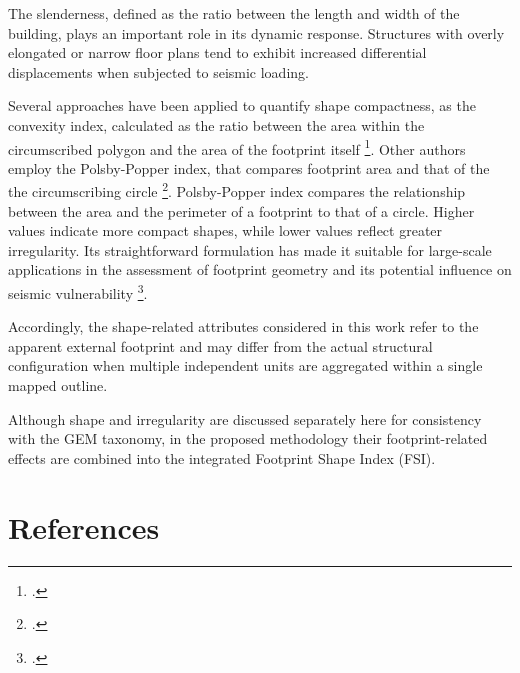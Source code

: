 \begin{refsection}
The slenderness, defined as the ratio between the length and width of the building, plays an important role in its dynamic response. Structures with overly elongated or narrow floor plans tend to exhibit increased differential displacements when subjected to seismic loading.

Several approaches have been applied to quantify shape compactness, as  the convexity index, calculated as the ratio between the area within the circumscribed polygon and the area of the footprint itself \footcite{sarabandi_building_2008, ji_fully_2019}. Other authors employ the Polsby-Popper index, that compares footprint area and that of the the circumscribing circle \footcite{polsby_third_1991}. Polsby-Popper index compares the relationship between the area and the perimeter of a footprint to that of a circle. Higher values indicate more compact shapes, while lower values reflect greater irregularity. Its straightforward formulation has made it suitable for large-scale applications in the assessment of footprint geometry and its potential influence on seismic vulnerability \footcite{torres_using_2023}.

Accordingly, the shape-related attributes considered in this work refer to the apparent external footprint and may differ from the actual structural configuration when multiple independent units are aggregated within a single mapped outline.

Although shape and irregularity are discussed separately here for consistency with the GEM taxonomy, in the proposed methodology their footprint-related effects are combined into the integrated Footprint Shape Index (FSI).

\newpage

\renewcommand{\sectionnametext}{References}
\renewcommand{\headingtextR}{\thesection. \sectionnametext}
\section{\sectionnametext}
\printbibliography[heading=none]

\end{refsection}